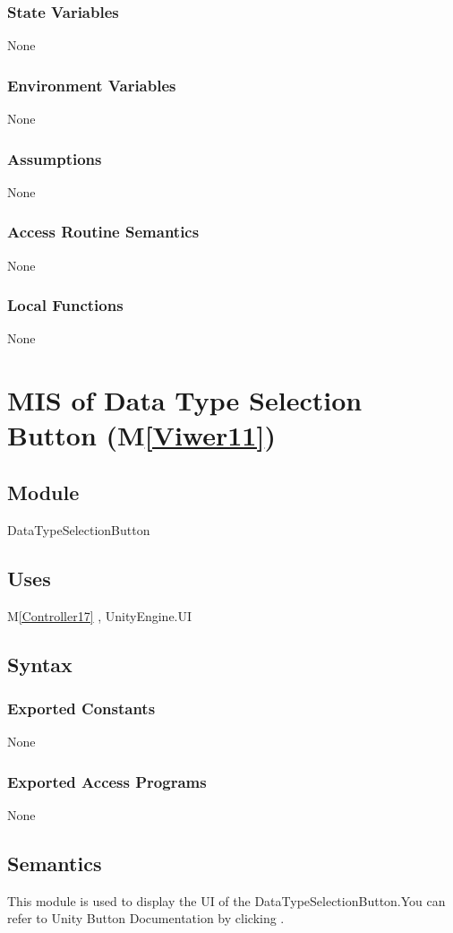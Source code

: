 \documentclass[12pt, titlepage]{article}
\newcommand{\mref}[1]{M\ref{#1}}
\begin{document}
\subsubsection{State Variables}
None
\subsubsection{Environment Variables}
None
\subsubsection{Assumptions}
None
\subsubsection{Access Routine Semantics}
None
\subsubsection{Local Functions}
None

\newpage

\section{MIS of Data Type Selection Button (\mref{Viwer11})}

\subsection{Module}
DataTypeSelectionButton

\subsection{Uses}
\mref{Controller17}  , UnityEngine.UI

\subsection{Syntax}
\subsubsection{Exported Constants}
None
\subsubsection{Exported Access Programs}
None

\subsection{Semantics}
This module is used to display the UI of the DataTypeSelectionButton.You can refer to Unity Button Documentation by clicking \bref.
\end{document}
